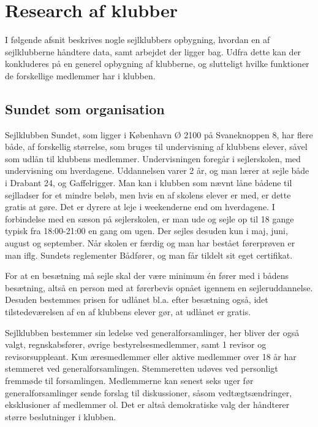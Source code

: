 \section{Research af klubber}\label{sec:research}

I følgende afsnit beskrives nogle sejlklubbers opbygning, hvordan en af sejlklubberne håndtere data, samt arbejdet der
ligger bag. Udfra dette kan der konkluderes på en generel opbygning af klubberne, og slutteligt hvilke funktioner de
forskellige medlemmer har i klubben.

\subsection{Sundet som organisation}

Sejlklubben Sundet, som ligger i København Ø 2100 på Svaneknoppen 8, har flere både, af forskellig størrelse, som bruges
til undervisning af klubbens elever, såvel som udlån til klubbens medlemmer. Undervisningen foregår i sejlerskolen, med
undervisning om hverdagene. Uddannelsen varer 2 år, og man lærer at sejle både i Drabant 24, og
Gaffelrigger. Man kan i klubben som nævnt låne bådene
til sejlladser for et mindre beløb, men hvis en af skolens elever er med, er dette gratis at gøre. Det er dyrere at leje
i weekenderne end om hverdagene. I forbindelse med en sæson på sejlerskolen, er man ude og sejle op til 18 gange typisk
fra 18:00-21:00 en gang om ugen. Der sejles desuden kun i maj, juni, august og september. Når skolen er færdig og man
har bestået førerprøven er man iflg. Sundets reglementer Bådfører, og man får tildelt sit eget certifikat.

For at en besætning må sejle skal der være minimum én fører med i bådens besætning, altså en person med at førerbevis
opnået igennem en sejleruddannelse. Desuden bestemmes prisen for udlånet bl.a. efter besætning også, idet
tilstedeværelsen af en af klubbens elever gør, at udlånet er gratis.\citep{Sundet}

Sejlklubben bestemmer sin ledelse ved generalforsamlinger, her bliver der også valgt, regnskabsfører, øvrige
bestyrelsesmedlemmer, samt 1 revisor og revisorsuppleant. Kun æresmedlemmer eller aktive medlemmer over 18 år har
stemmeret ved generalforsamlingen. Stemmeretten udøves ved personligt fremmøde til forsamlingen. Medlemmerne kan senest
seks uger før generalforsamlinger sende forslag til diskussioner, såsom vedtægtsændringer, eksklusioner af medlemmer
ol. Det er altså demokratiske valg der håndterer større beslutninger i klubben.

